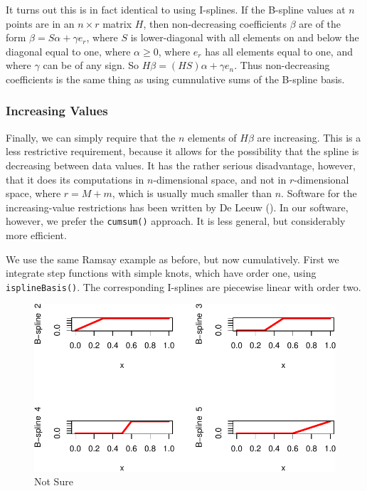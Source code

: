 \documentclass[
  12pt,
  letterpaper,
  DIV=11,
  numbers=noendperiod]{scrreprt}
\theoremstyle{remark}
\begin{document}
It turns out this is in fact identical to using I-splines. If the
B-spline values at \(n\) points are in an \(n\times r\) matrix \(H\),
then non-decreasing coefficients \(\beta\) are of the form
\(\beta=S\alpha+\gamma e_r\), where \(S\) is lower-diagonal with all
elements on and below the diagonal equal to one, where \(\alpha\geq 0\),
where \(e_r\) has all elements equal to one, and where \(\gamma\) can be
of any sign. So \(H\beta=(HS)\alpha+\gamma e_n\). Thus non-decreasing
coefficients is the same thing as using cumnulative sums of the B-spline
basis.

\subsubsection{Increasing Values}\label{increasing-values}

Finally, we can simply require that the \(n\) elements of \(H\beta\) are
increasing. This is a less restrictive requirement, because it allows
for the possibility that the spline is decreasing between data values.
It has the rather serious disadvantage, however, that it does its
computations in \(n\)-dimensional space, and not in \(r\)-dimensional
space, where \(r=M+m\), which is usually much smaller than \(n\).
Software for the increasing-value restrictions has been written by De
Leeuw (). In our software, however, we
prefer the \texttt{cumsum()} approach. It is less general, but
considerably more efficient.

We use the same Ramsay example as before, but now cumulatively. First we
integrate step functions with simple knots, which have order one, using
\texttt{isplineBasis()}. The corresponding I-splines are piecewise
linear with order two.

\begin{figure}[H]

{\centering \includegraphics{splinical_files/figure-pdf/Iorder1mult1-1.pdf}

}

\caption{Not Sure}

\end{figure}%
\end{document}
